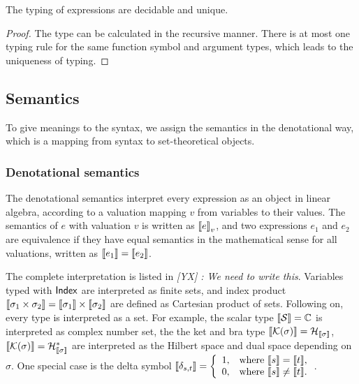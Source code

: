 \documentclass[runningheads]{llncs}
\newcommand{\yx}[1]{\textit{\color{blue}[YX] : #1}}
\begin{document}
\begin{lemma}
    The typing of expressions are decidable and unique.
\end{lemma}
\begin{proof}
    The type can be calculated in the recursive manner. There is at most one typing rule for the same function symbol and argument types, which leads to the uniqueness of typing.
\end{proof}

\subsection{Semantics}



To give meanings to the syntax, we assign the semantics in the denotational way, which is a mapping from syntax to set-theoretical objects.

\subsubsection{Denotational semantics} 
The denotational semantics interpret every expression as an object in linear algebra, according to a valuation mapping $v$ from variables to their values. 
The semantics of $e$ with valuation $v$ is written as ${\llbracket e \rrbracket}_v$, and two expressions $e_1$ and $e_2$ are equivalence if they have equal semantics in the mathematical sense for all valuations, written as ${\llbracket e_1 \rrbracket} = {\llbracket e_2 \rrbracket}$.

The complete interpretation is listed in \yx{We need to write this}.
Variables typed with $\mathsf{Index}$ are interpreted as finite sets, and index product ${\llbracket \sigma_1 \times \sigma_2 \rrbracket} = {\llbracket \sigma_1 \rrbracket} \times {\llbracket \sigma_2 \rrbracket}$ are defined as Cartesian product of sets. Following on, every type is interpreted as a set. For example, the scalar type ${\llbracket \mathcal{S} \rrbracket} = \mathbb{C}$ is interpreted as complex number set, the the ket and bra type ${\llbracket \mathcal{K}(\sigma) \rrbracket} = \mathcal{H}_{{\llbracket \sigma \rrbracket}}$, ${\llbracket \mathcal{K}(\sigma) \rrbracket} = \mathcal{H}_{{\llbracket \sigma \rrbracket}}^*$ are interpreted as the Hilbert space and dual space depending on $\sigma$. One special case is the delta symbol 
${\llbracket \delta_{s, t} \rrbracket} = 
\left \{  
    \begin{array}{ll}
        1, & \text{where } {\llbracket s \rrbracket} = {\llbracket t \rrbracket}, \\
        0, & \text{where } {\llbracket s \rrbracket} \neq {\llbracket t \rrbracket}.
    \end{array} 
\right .
$.
\end{document}
